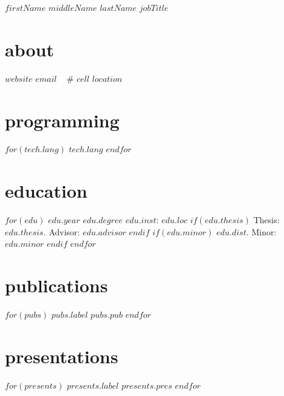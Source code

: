 \documentclass[]{friggeri-cv}
\begin{document}
\header
  {$firstName$ $middleName$ }
  {$lastName$}
  {$jobTitle$}



\begin{aside}
  \section{about}
    \href{http://$website$}{$website$}
    \href{mailto:$email$}{$email$}
    ~
    \# $cell$
    $location$
    \section{programming}
    $for(tech.lang)$
      $tech.lang$
    $endfor$
\end{aside}



\section{education}
\begin{entrylist}
$for(edu)$
  \entry
  {$edu.year$}
  {$edu.degree$}
  {$edu.inst$: $edu.loc$}
  $if(edu.thesis)$
    {Thesis: \textit{$edu.thesis$.} Advisor: $edu.advisor$}
  $endif$
  $if(edu.minor)$
    {$edu.dist$. Minor: $edu.minor$}
  $endif$
$endfor$
\end{entrylist}



\section{publications}
\begin{entrylist}
$for(pubs)$
  \entry
  {$pubs.label$}
  {}
  {}
  {$pubs.pub$}
$endfor$
\end{entrylist}



\section{presentations}
\begin{entrylist}
$for(presents)$
  \entry
  {$presents.label$}
  {}
  {}
  {$presents.pres$}
$endfor$
\end{entrylist}
\end{document}
